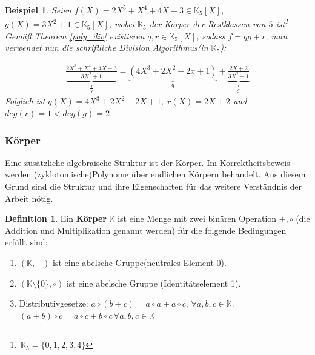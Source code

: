 \documentclass[12pt,oneside]{article}
\newtheorem{example}[theorem]{Beispiel}
\theoremstyle{remark}
\theoremstyle{definition}
\newtheorem{definition}{Definition}[section]
\begin{document}
\begin{example}
Seien $f(X) = 2X^5 + X^4 + 4X + 3 \in \mathbb{K}_5[X]$, $g(X)= 3X^2 + 1 \in \mathbb{K}_5[X]$, wobei $\mathbb{K}_5$ der Körper der Restklassen von $5$ ist\footnote{$ \,\mathbb{K}_5 = \{ 0, 1, 2, 3, 4\}$}. Gemäß Theorem \ref{poly_div} existieren $q,r \in \mathbb{K}_5[X]$, sodass $f = qg + r$, man verwendet nun die schriftliche Division Algorithmus(in $\mathbb{K}_5$)\cite{long-div}:

\begin{align*}
   \underbrace{\frac{2X^5 + X^4 + 4X + 3}{3X^2 + 1}}_{\frac{f}{g}} = \underbrace{(4X^3 + 2X^2 + 2x + 1) }_{q}+ \underbrace{\frac{2X + 2}{3X^2 + 1}}_{\frac{r}{g}}
\end{align*}
Folglich ist $q(X) = 4X^3 + 2X^2 + 2X + 1, \; r(X) = 2X + 2$ und $deg(r) = 1 < deg(g) = 2 $. 
\end{example}

\smallskip

\subsubsection{Körper}
Eine zusätzliche algebraische Struktur ist der Körper. Im Korrektheitsbeweis werden (zyklotomische)Polynome über endlichen Körpern behandelt. Aus diesem Grund sind die Struktur und ihre Eigenschaften für das weitere Verständnis der Arbeit nötig.

\begin{definition}\label{field_axioms}
Ein \textbf{Körper} $\mathbb{K}$ ist eine Menge mit zwei binären Operation $+,\circ$ (die Addition und Multiplikation genannt werden) für die folgende Bedingungen erfüllt sind:
\begin{enumerate}
    \item $(\mathbb{K},+)$ ist eine abelsche Gruppe(neutrales Element 0).
    
    \item $(\mathbb{K}\setminus \{ 0\}, \circ)$ ist eine abelsche Gruppe (Identitätselement 1).
    
    \item Distributivgesetze:\newline
        $a \circ (b + c) = a \circ a + a \circ c, \, \forall a,b,c \in \mathbb{K}$.\newline
        $(a + b) \circ c = a \circ c + b \circ c \, \forall a,b,c \in \mathbb{K}$
\end{enumerate}
\end{definition}
\end{document}
